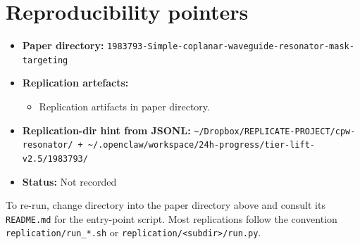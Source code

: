 \documentclass[11pt]{article}
\begin{document}
\section{Reproducibility pointers}\label{sec:repro}
\begin{itemize}
\item \textbf{Paper directory:} \texttt{1983793-Simple-coplanar-waveguide-resonator-mask-targeting}
\item \textbf{Replication artefacts:}
\begin{itemize}
\item Replication artifacts in paper directory.
\end{itemize}
\item \textbf{Replication-dir hint from JSONL:} \texttt{\textasciitilde{}/Dropbox/REPLICATE-PROJECT/cpw-resonator/ + \textasciitilde{}/.openclaw/workspace/24h-progress/tier-lift-v2.5/1983793/}
\item \textbf{Status:} Not recorded
\end{itemize}

To re-run, change directory into the paper directory above and consult its \texttt{README.md} for the entry-point script. Most replications follow the convention \texttt{replication/run\_*.sh} or \texttt{replication/<subdir>/run.py}.
\end{document}

